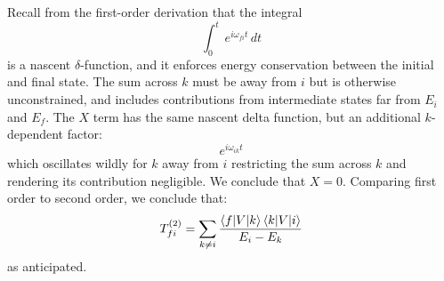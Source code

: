 \documentclass[12pt]{article}
\begin{document}
Recall from the first-order derivation that the integral
$$\int_0^t \, e^{ i \omega_{fi} t} \, dt$$
is a nascent $\delta$-function, and it enforces energy conservation
between the initial and final state.  The sum across $k$ must be away
from $i$ but is otherwise unconstrained, and includes contributions
from intermediate states far from $E_i$ and $E_f$.  The $X$ term has
the same nascent delta function, but an additional $k$-dependent
factor:
$$e^{ i \omega_{ik} t}$$
which oscillates wildly for $k$ away from $i$ restricting the sum
across $k$ and rendering its contribution negligible.  We conclude that
$X=0$.  Comparing first order to second order, we conclude that:
$$T_{fi}^{(2)} = \sum_{k \neq i} \frac{\braket{f|V|k}\braket{k|V|i}}{E_i-E_k}$$
as anticipated.
\end{document}
